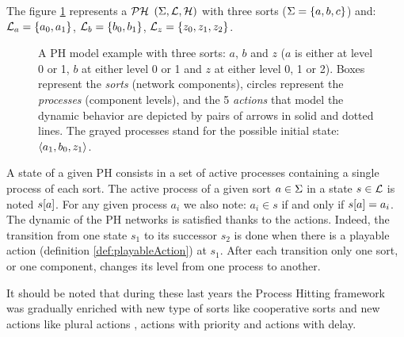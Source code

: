 \begin{example}
The figure \ref{fig:ph} represents a $\mathcal{PH}$ $(\Sigma,\mathcal{L},\mathcal{H})$ with three sorts
($\Sigma = \{a, b, c\}$) and:
$\mathcal{L}_a = \{a_0, a_1\}$,
$\mathcal{L}_b = \{b_0, b_1\}$,
$\mathcal{L}_z = \{z_0, z_1, z_2\}$.
\begin{figure}[ht]
\label{fig:ph} 
\centering
{}
\caption{
A PH model example with three sorts: $a$, $b$ and $z$ ($a$ is either at level 0 or 1, $b$ at either level 0 or 1 and $z$ at either level 0, 1 or 2). Boxes represent the \emph{sorts} (network components), circles represent the \emph{processes} (component levels), and the 5 \emph{actions} that model the dynamic behavior are depicted by pairs of arrows in solid and dotted lines. The grayed processes stand for the possible initial state: $\mbox{$\langle a_1, b_0, z_1 \rangle$}$.
}
\end{figure}
\end{example}

A state of a given PH consists in a set of active processes containing a single process of each sort.
The active process of a given sort $a \in \Sigma$ in a state $s \in \mathcal{L}$
is noted ${s[a]}$.
For any given process $a_i$ we also note: $a_i \in s$ if and only if ${s[a]} = a_i$. The dynamic of the PH networks is satisfied thanks to the actions. Indeed, the transition from one state $s_1$ to its successor $s_2$ is done when there is a playable action (definition \ref{def:playableAction}) at $s_1$. After each transition only one sort, or one component, changes its level from one process to another.

It should be noted that during these last years the Process Hitting framework was gradually enriched with new type of sorts like cooperative sorts and new actions like plural actions \cite{folschette-phd-14}, actions with priority \cite{FPMR13-CS2Bio} and actions with delay.

